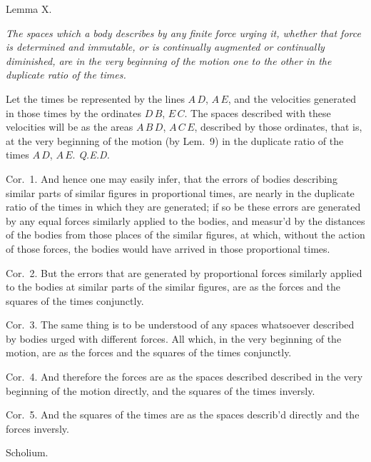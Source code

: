 \bigbreak

\centerline{\largesc Lemma X.}

\nobreak\bigskip

{\it
The spaces which a body describes by any finite force urging it,
whether that force is determined and immutable, or is continually
augmented or continually diminished, are in the very beginning
of the motion one to the other in the duplicate ratio of the
times.}

\bigbreak

Let the times be represented by the lines $A \, D$, $A \, E$, and
the velocities generated in those times by the ordinates
$D \, B$, $E \, C$.  The spaces described with these velocities
will be as the areas $A \, B \, D$, $A \, C \, E$, described by
those ordinates, that is, at the very beginning of the motion (by
Lem.~9) in the duplicate ratio of the times $A \, D$, $A \, E$.
{\it Q.E.D.}

{\sc Cor.}~1.
And hence one may easily infer, that the errors of bodies
describing similar parts of similar figures in proportional
times, are nearly in the duplicate ratio of the times in which
they are generated; if so be these errors are generated by any
equal forces similarly applied to the bodies, and measur'd by the
distances of the bodies from those places of the similar figures,
at which, without the action of those forces, the bodies would
have arrived in those proportional times.

{\sc Cor.}~2.
But the errors that are generated by proportional forces
similarly applied to the bodies at similar parts of the similar
figures, are as the forces and the squares of the times
conjunctly.

{\sc Cor.}~3.
The same thing is to be understood of any spaces whatsoever
described by bodies urged with different forces.  All which, in
the very beginning of the motion, are as the forces and the
squares of the times conjunctly.

{\sc Cor.}~4.
And therefore the forces are as the spaces described described in
the very beginning of the motion directly, and the squares of the
times inversly.

{\sc Cor.}~5.
And the squares of the times are as the spaces describ'd directly
and the forces inversly.

\bigbreak

\centerline{\largesc Scholium.}

\nobreak\bigskip

